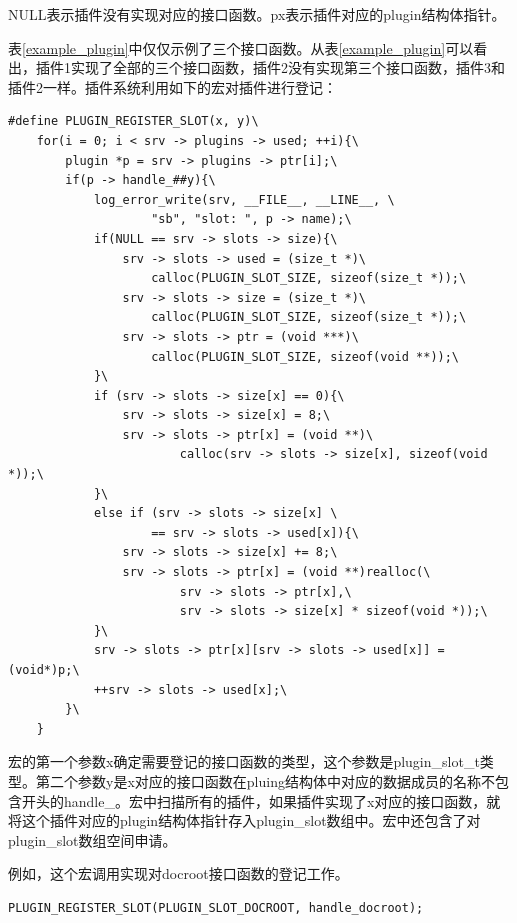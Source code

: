 \documentclass[twoside, xetex]{report}
\begin{document}
	NULL表示插件没有实现对应的接口函数。px表示插件对应的plugin结构体指针。
	
	表\ref{example_plugin}中仅仅示例了三个接口函数。从表\ref{example_plugin}可以看出，插件1实现了全部的三个接口函数，插件2没有实现第三个接口函数，插件3和插件2一样。插件系统利用如下的宏对插件进行登记：
	
\begin{lstlisting}
#define PLUGIN_REGISTER_SLOT(x, y)\
 	for(i = 0; i < srv -> plugins -> used; ++i){\
  		plugin *p = srv -> plugins -> ptr[i];\
  		if(p -> handle_##y){\
   			log_error_write(srv, __FILE__, __LINE__, \
   					"sb", "slot: ", p -> name);\
   			if(NULL == srv -> slots -> size){\
    			srv -> slots -> used = (size_t *)\
    				calloc(PLUGIN_SLOT_SIZE, sizeof(size_t *));\
    			srv -> slots -> size = (size_t *)\
    				calloc(PLUGIN_SLOT_SIZE, sizeof(size_t *));\
				srv -> slots -> ptr = (void ***)\
					calloc(PLUGIN_SLOT_SIZE, sizeof(void **));\
   			}\
   			if (srv -> slots -> size[x] == 0){\
				srv -> slots -> size[x] = 8;\
				srv -> slots -> ptr[x] = (void **)\
						calloc(srv -> slots -> size[x], sizeof(void *));\
   			}\
   			else if (srv -> slots -> size[x] \
   					== srv -> slots -> used[x]){\
				srv -> slots -> size[x] += 8;\
				srv -> slots -> ptr[x] = (void **)realloc(\
						srv -> slots -> ptr[x],\
						srv -> slots -> size[x] * sizeof(void *));\
   			}\
   			srv -> slots -> ptr[x][srv -> slots -> used[x]] = (void*)p;\
   			++srv -> slots -> used[x];\
  		}\
 	}
\end{lstlisting}

	宏的第一个参数x确定需要登记的接口函数的类型，这个参数是plugin\_slot\_t类型。第二个参数y是x对应的接口函数在pluing结构体中对应的数据成员的名称不包含开头的handle\_。宏中扫描所有的插件，如果插件实现了x对应的接口函数，就将这个插件对应的plugin结构体指针存入plugin\_slot数组中。宏中还包含了对plugin\_slot数组空间申请。
	
	例如，这个宏调用实现对docroot接口函数的登记工作。
\begin{lstlisting}
PLUGIN_REGISTER_SLOT(PLUGIN_SLOT_DOCROOT, handle_docroot);
\end{lstlisting}
\end{document}
